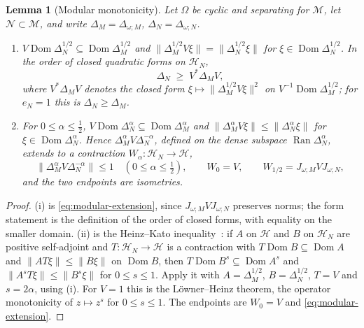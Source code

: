 \documentclass[a4paper,11pt]{article}
\newtheorem{lemma}[theorem]{Lemma}
\theoremstyle{definition}
\begin{document}
\begin{lemma}[Modular monotonicity]\label{lem:modular-monotonicity}
Let $\Omega$ be cyclic and separating for $\mathcal M$, let $\mathcal N\subset\mathcal M$, and write $\Delta_M=\Delta_{\omega;M}$, $\Delta_N=\Delta_{\omega;N}$.
\begin{enumerate}
 \item[\rm(i)] $V\operatorname{Dom}\Delta_N^{1/2}\subseteq\operatorname{Dom}\Delta_M^{1/2}$ and $\|\Delta_M^{1/2}V\xi\|=\|\Delta_N^{1/2}\xi\|$ for $\xi\in\operatorname{Dom}\Delta_N^{1/2}$. In the order of closed quadratic forms on $\mathcal H_N$,
 \begin{equation}
  \Delta_N\;\geq\;V^*\Delta_MV ,
  \label{eq:modular-inequality}
 \end{equation}
 where $V^*\Delta_MV$ denotes the closed form $\xi\mapsto\|\Delta_M^{1/2}V\xi\|^2$ on $V^{-1}\operatorname{Dom}\Delta_M^{1/2}$; for $e_N=1$ this is $\Delta_N\geq\Delta_M$.
 \item[\rm(ii)] For $0\le\alpha\le\tfrac12$, $V\operatorname{Dom}\Delta_N^{\alpha}\subseteq\operatorname{Dom}\Delta_M^{\alpha}$ and $\|\Delta_M^{\alpha}V\xi\|\le\|\Delta_N^{\alpha}\xi\|$ for $\xi\in\operatorname{Dom}\Delta_N^{\alpha}$. Hence $\Delta_M^{\alpha}V\Delta_N^{-\alpha}$, defined on the dense subspace $\operatorname{Ran}\Delta_N^{\alpha}$, extends to a contraction $W_\alpha:\mathcal H_N\to\mathcal H$,
 \begin{equation}
  \|\Delta_M^{\alpha}V\Delta_N^{-\alpha}\|\le1\quad(0\le\alpha\le\tfrac12),
  \qquad W_0=V,\qquad W_{1/2}=J_{\omega;M}VJ_{\omega;N},
  \label{eq:characteristic-bounded}
 \end{equation}
 and the two endpoints are isometries.
\end{enumerate}
\end{lemma}
\begin{proof}
(i) is \eqref{eq:modular-extension}, since $J_{\omega;M}VJ_{\omega;N}$ preserves norms; the form statement is the definition of the order of closed forms, with equality on the smaller domain. (ii) is the Heinz--Kato inequality~\cite{Kato1952}: if $A$ on $\mathcal H$ and $B$ on $\mathcal H_N$ are positive self-adjoint and $T:\mathcal H_N\to\mathcal H$ is a contraction with $T\operatorname{Dom}B\subseteq\operatorname{Dom}A$ and $\|AT\xi\|\le\|B\xi\|$ on $\operatorname{Dom}B$, then $T\operatorname{Dom}B^{s}\subseteq\operatorname{Dom}A^{s}$ and $\|A^{s}T\xi\|\le\|B^{s}\xi\|$ for $0\le s\le1$. Apply it with $A=\Delta_M^{1/2}$, $B=\Delta_N^{1/2}$, $T=V$ and $s=2\alpha$, using (i). For $V=1$ this is the L\"owner--Heinz theorem, the operator monotonicity of $z\mapsto z^{s}$ for $0\le s\le1$. The endpoints are $W_0=V$ and \eqref{eq:modular-extension}.
\end{proof}
\end{document}
